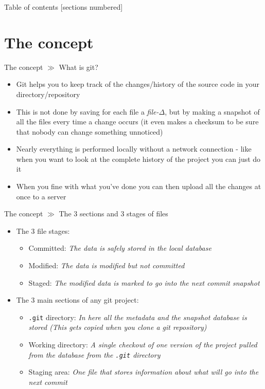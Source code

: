 \documentclass[10pt]{beamer}
\title{\mytitleTitle}
\subtitle{\mytitleSubtitle}
\date{\mydate}
\author{\myauthor}
\institute{Universit{\"a}t Stuttgart}
\begin{document}
\maketitle


\begin{frame}{Table of contents}
[sections numbered]
\tableofcontents[hideallsubsections]
\end{frame}


\section{The concept}

\begin{frame}{The concept $\gg$ What is git?}
\begin{itemize}
	\item Git helps you to keep track of the changes/history of the source code in your directory/repository
	\item This is not done by saving for each file a \textit{file-$\Delta$}, but by making a snapshot of all the files every time a change occurs (it even makes a checksum to be sure that nobody can change something unnoticed)
	\item Nearly everything is performed locally without a network connection - like when you want to look at the complete history of the project you can just do it
	\item When you fine with what you've done you can then upload all the changes at once to a server
\end{itemize}
\end{frame}

\begin{frame}{The concept $\gg$ The 3 sections and 3 stages of files}
\begin{itemize}
	\item The 3 file stages:
	\begin{itemize}
		\item Committed: \textit{The data is safely stored in the local database}
		\item Modified: \textit{The data is modified but not committed}
		\item Staged: \textit{The modified data is marked to go into the next commit snapshot}
	\end{itemize}
	\item The 3 main sections of any git project:
	\begin{itemize}
		\item \texttt{.git} directory: \textit{In here all the metadata and the snapshot database is stored (This gets copied when you clone a git repository)}
		\item Working directory: \textit{A single checkout of one version of the project pulled from the database from the \texttt{.git} directory}
		\item Staging area: \textit{One file that stores information about what will go into the next commit}
	\end{itemize}
\end{itemize}
\end{frame}
\end{document}
